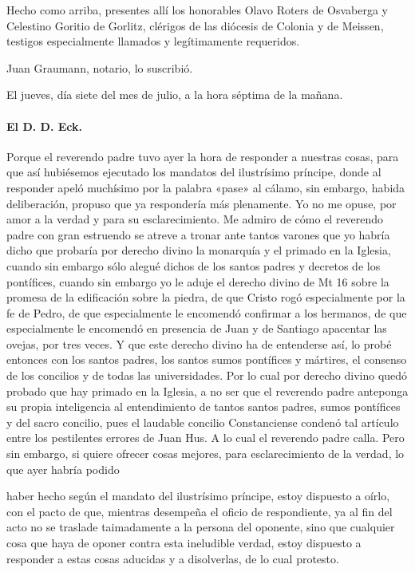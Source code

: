 Hecho como arriba, presentes allí los honorables Olavo Roters de Osvaberga y Celestino Goritio de Gorlitz, clérigos de las diócesis de Colonia y de Meissen, testigos especialmente llamados y legítimamente requeridos.

Juan Graumann, notario, lo suscribió.

\marginpar{\small[298]} El jueves, día siete del mes de julio, a la hora séptima de la mañana.

\paragraph*{El D. D. Eck.}

Porque el reverendo padre tuvo ayer la hora de responder a nuestras cosas, para que así hubiésemos ejecutado los mandatos del ilustrísimo príncipe, donde al responder apeló muchísimo por la palabra «pase» al cálamo, sin embargo, habida deliberación, propuso que ya respondería más plenamente. Yo no me opuse, por amor a la verdad y para su esclarecimiento. Me admiro de cómo el reverendo padre con gran estruendo se atreve a tronar ante tantos varones que yo habría dicho que probaría por derecho divino la monarquía y el primado en la Iglesia, cuando sin embargo sólo alegué dichos de los santos padres y decretos de los pontífices, cuando sin embargo yo le aduje el derecho divino de Mt 16 sobre la promesa de la edificación sobre la piedra, de que Cristo rogó especialmente por la fe de Pedro, de que especialmente le encomendó confirmar a los hermanos, de que especialmente le encomendó en presencia de Juan y de Santiago apacentar las ovejas, por tres veces. Y que este derecho divino ha de entenderse así, lo probé entonces con los santos padres, los santos sumos pontífices y mártires, el consenso de los concilios y de todas las universidades. Por lo cual por derecho divino quedó probado que hay primado en la Iglesia, a no ser que el reverendo padre anteponga su propia inteligencia al entendimiento de tantos santos padres, sumos pontífices y del sacro concilio, pues el laudable concilio Constanciense condenó tal artículo entre los pestilentes errores de Juan Hus. A lo cual el reverendo padre calla. Pero sin embargo, si quiere ofrecer cosas mejores, para esclarecimiento de la verdad, lo que ayer habría podido

haber hecho según el mandato del ilustrísimo príncipe, estoy dispuesto a oírlo, con el pacto de que, mientras desempeña el oficio de respondiente, ya al fin del acto no se traslade taimadamente a la persona del oponente, sino que cualquier cosa que haya de oponer contra esta ineludible verdad, estoy dispuesto a responder a estas cosas aducidas y a disolverlas, de lo cual protesto.

